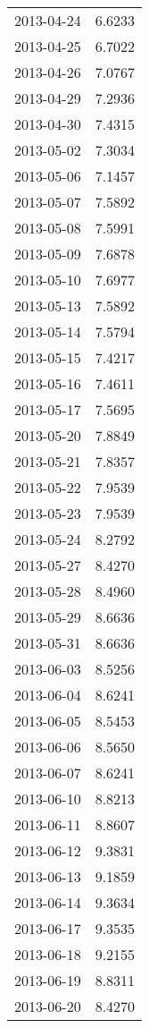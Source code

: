 \begin{tabular}{lr}
2013-04-24 &      6.6233 \\
2013-04-25 &      6.7022 \\
2013-04-26 &      7.0767 \\
2013-04-29 &      7.2936 \\
2013-04-30 &      7.4315 \\
2013-05-02 &      7.3034 \\
2013-05-06 &      7.1457 \\
2013-05-07 &      7.5892 \\
2013-05-08 &      7.5991 \\
2013-05-09 &      7.6878 \\
2013-05-10 &      7.6977 \\
2013-05-13 &      7.5892 \\
2013-05-14 &      7.5794 \\
2013-05-15 &      7.4217 \\
2013-05-16 &      7.4611 \\
2013-05-17 &      7.5695 \\
2013-05-20 &      7.8849 \\
2013-05-21 &      7.8357 \\
2013-05-22 &      7.9539 \\
2013-05-23 &      7.9539 \\
2013-05-24 &      8.2792 \\
2013-05-27 &      8.4270 \\
2013-05-28 &      8.4960 \\
2013-05-29 &      8.6636 \\
2013-05-31 &      8.6636 \\
2013-06-03 &      8.5256 \\
2013-06-04 &      8.6241 \\
2013-06-05 &      8.5453 \\
2013-06-06 &      8.5650 \\
2013-06-07 &      8.6241 \\
2013-06-10 &      8.8213 \\
2013-06-11 &      8.8607 \\
2013-06-12 &      9.3831 \\
2013-06-13 &      9.1859 \\
2013-06-14 &      9.3634 \\
2013-06-17 &      9.3535 \\
2013-06-18 &      9.2155 \\
2013-06-19 &      8.8311 \\
2013-06-20 &      8.4270 \\

\end{tabular}

